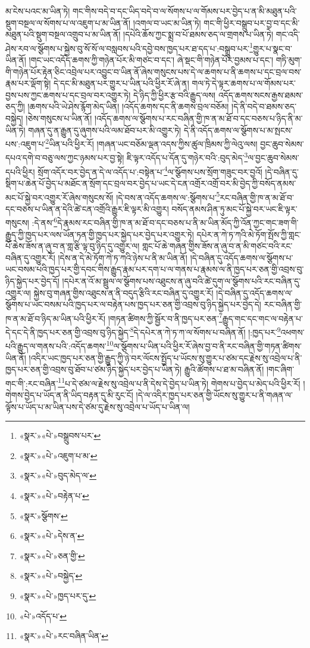 མ་ངེས་པའང་མ་ཡིན་ཏེ། གང་གིས་བདེ་བ་དང་ཡིད་བདེ་བ་ལ་སོགས་པ་ལ་གོམས་པར་བྱེད་པ་ན་མི་མཐུན་པའི་སྡུག་བསྔལ་ལ་སོགས་པ་ལ་འཇུག་པ་མ་ཡིན་ནོ། །འགལ་བ་ཡང་མ་ཡིན་ཏེ། གང་གི་ཕྱིར་བསྒྲུབ་པར་བྱ་བ་དང་མི་མཐུན་པའི་སྡུག་བསྔལ་འགྲུབ་པ་མ་ཡིན་ནོ། །དཔེའི་ཆོས་ཀྱང་སྨྲ་བ་པོ་ཐམས་ཅད་ལ་གྲགས་པ་ཡིན་ཏེ། གང་འདི་ཤེས་རབ་ལ་སྩོགས་པ་སྐྱེས་བུ་སོ་སོ་ལ་བསླབས་པའི་དབྱེ་བས་ཁྱད་པར་ཐ་དད་པ་:བསྒྲུབ་པར་\footnote{«སྣར་»«པེ་»བསྒྲུབས་པར་}གྱུར་པ་སྣང་བ་ཡིན་ནོ། །གང་ཡང་འདོད་ཆགས་ཀྱི་གཉེན་པོར་མི་གཙང་བ་དང་། ཞེ་སྡང་གི་གཉེན་པོར་བྱམས་པ་དང་། གཏི་མུག་གི་གཉེན་པོར་རྟེན་ཅིང་འབྲེལ་པར་འབྱུང་བ་ཡིན་ནོ་ཞེས་གསུངས་པས་དེ་ལ་ཆགས་པ་ནི་ཆགས་པ་དང་བྲལ་བས་རྣམ་པར་ལྡོག་སྟེ། དེ་དང་མི་མཐུན་པར་གྱུར་པ་ཡིན་པའི་ཕྱིར་རོ་ཞེ་ན། གལ་ཏེ་དེ་ལྟར་ཆགས་པ་ལ་གོམས་པར་བྱས་པས་ཀྱང་ཆགས་པ་དང་བྲལ་བར་འགྱུར་ཏེ། དེ་ཉིད་ཀྱི་ཕྱིར་རྩ་བའི་རྒྱུད་ལས། འདོད་ཆགས་སངས་རྒྱས་ཐམས་ཅད་ཀྱི། །ཆགས་པའི་ཡེ་ཤེས་རྙོག་མེད་ཡིན། །འདོད་ཆགས་དང་ནི་ཆགས་བྲལ་བཅོམ། །དེ་ནི་བདེ་བ་ཐམས་ཅད་བསྐྱེད། །ཅེས་གསུངས་པ་ཡིན་ནོ། །འདོད་ཆགས་ལ་སྩོགས་པ་རང་བཞིན་གྱི་ཁ་ན་མ་ཐོ་བ་དང་བཅས་པ་ཉིད་ནི་མ་ཡིན་ཏེ། གཞན་དུ་ན་རྒྱུན་དུ་ཞུགས་པའི་ལམ་ཐོབ་པར་མི་འགྱུར་ཏེ། དེ་ནི་འདོད་ཆགས་ལ་སྩོགས་པ་མ་སྤངས་པས་:འཇུག་པ་\footnote{«སྣར་»«པེ་»འཇུག་པ་མ་}ཡིན་པའི་ཕྱིར་རོ། །གཞན་ཡང་བཅོམ་ལྡན་འདས་ཀྱིས་ཚུལ་ཁྲིམས་ཀྱི་ལེའུ་ལས། བྱང་ཆུབ་སེམས་དཔའ་དགེ་བ་བཅུ་ལས་ཀྱང་ཉམས་པར་བྱ་སྟེ། ཇི་ལྟར་འདོད་པ་དོན་དུ་གཉེར་བའི་:བུད་མེད་\footnote{«སྣར་»«པེ་»བུད་མེད་ལ་}ལ་བྱང་ཆུབ་སེམས་དཔའི་ཕྱིར། སྲོག་འདོར་བར་བྱེད་ན་དེ་ལ་འདོད་པ་:བསྟེན་པ་\footnote{«སྣར་»«པེ་»བརྟེན་པ་}ལ་སྩོགས་པས་སྲོག་གཟུང་བར་བྱའོ། །དེ་བཞིན་དུ་སྡིག་པ་ཆེན་པོ་བྱེད་པ་མཐོང་ན་སྲོག་དང་བྲལ་བར་བྱེད་པ་ཡང་དེ་ངན་འགྲོར་འགྲོ་བར་མི་བྱེད་ཀྱི་བསོད་ནམས་མང་པོ་སྐྱེ་བར་འགྱུར་རོ་ཞེས་གསུངས་སོ། །དེ་བས་ན་འདོད་ཆགས་ལ་:སྩོགས་པ་\footnote{«སྣར་»སྩོགས་}རང་བཞིན་གྱི་ཁ་ན་མ་ཐོ་བ་དང་བཅས་པ་ཡིན་ན་དེའི་ཚེ་ངན་འགྲོའི་རྒྱུར་ཇི་ལྟར་མི་འགྱུར། བསོད་ནམས་ཤིན་ཏུ་མང་པོ་སྐྱེ་བར་ཡང་ཇི་ལྟར་གསུངས། :དེ་ནས་\footnote{«སྣར་»«པེ་»དེས་ན་}དེ་རྣམས་རང་བཞིན་གྱི་ཁ་ན་མ་ཐོ་བ་དང་བཅས་པ་ནི་མ་ཡིན་མོད་ཀྱི་འོན་ཀྱང་གང་ཟག་གི་རྒྱུད་ཀྱི་ཁྱད་པར་ལས་ཡོན་ཏན་གྱི་ཁྱད་པར་སྐྱེད་པར་བྱེད་པར་འགྱུར་ཏེ། དཔེར་ན་ཀེ་ཏ་ཀའི་མེ་ཏོག་སྤོས་ཀྱི་གླང་པོ་ཆེས་ཟོས་ན་ཞུ་བ་ན་གླ་རྩི་ལྟ་བུ་ཉིད་དུ་འགྱུར་ལ། གླང་པོ་ཆེ་གཞན་གྱིས་ཟོས་ན་ཞུ་བ་ན་མི་གཙང་བའི་རང་བཞིན་དུ་འགྱུར་རོ། །དེས་ན་དེ་མེ་ཏོག་ཀེ་ཏ་ཀའི་ཉེས་པ་ནི་མ་ཡིན་ནོ། །དེ་བཞིན་དུ་འདོད་ཆགས་ལ་སྩོགས་པ་ཡང་བསམ་པའི་ཁྱད་པར་གྱི་དབང་གིས་རྒྱུད་རྣམ་པར་དག་པ་ལ་གནས་པ་རྣམས་ལ་ནི་ཁྱད་པར་ཅན་གྱི་འབྲས་བུ་ཉིད་སྐྱེད་པར་བྱེད་དོ། །དཔེར་ན་འོ་མ་སྦྲུལ་ལ་སྩོགས་པས་འཐུངས་ན་ཞུ་བའི་ཚེ་དུག་ལ་སྩོགས་པའི་རང་བཞིན་དུ་འགྱུར་ལ། སྐྱེས་བུ་གཞན་གྱིས་འཐུངས་ན་ནི་བདུད་རྩིའི་རང་བཞིན་དུ་འགྱུར་རོ། །དེ་བཞིན་དུ་འདོད་ཆགས་ལ་སྩོགས་པ་ཡང་བསམ་པའི་ཁྱད་པར་ལ་བརྟེན་པས་ཁྱད་པར་ཅན་གྱི་འབྲས་བུ་ཉིད་སྐྱེད་པར་བྱེད་དེ། རང་བཞིན་གྱི་ཁ་ན་མ་ཐོ་བ་ཉིད་མ་ཡིན་པའི་ཕྱིར་རོ། །གཏན་ཚིགས་ཀྱི་སྦྱོར་བ་ནི་ཁྱད་པར་ཅན་\footnote{«སྣར་»«པེ་»ཅན་གྱི་}རྒྱུད་གང་དང་གང་ལ་བརྟེན་པ་དེ་དང་དེ་ནི་ཁྱད་པར་ཅན་གྱི་འབྲས་བུ་ཉིད་སྐྱེད་\footnote{«སྣར་»«པེ་»བསྐྱེད་}དེ་དཔེར་ན་ཀེ་ཏ་ཀ་ལ་སོགས་པ་བཞིན་ནོ། །:ཁྱད་པར་\footnote{«སྣར་»«པེ་»ཁྱད་པར་དུ་}འཕགས་པའི་རྒྱུད་ལ་གནས་པའི་:འདོད་ཆགས་\footnote{«པེ་»འདོད་པ་}ལ་སྩོགས་པ་ཡིན་པའི་ཕྱིར་རོ་ཞེས་བྱ་བ་ནི་རང་བཞིན་གྱི་གཏན་ཚིགས་ཡིན་ནོ། །འདིར་ཡང་ཁྱད་པར་ཅན་གྱི་རྒྱུད་ཀྱི་ཉེ་བར་ལོངས་སྤྱོད་པ་ཡོངས་སུ་གྱུར་པ་ཙམ་དང་རྗེས་སུ་འབྲེལ་པ་ནི་ཁྱད་པར་ཅན་གྱི་འབྲས་བུ་ཐོབ་པ་ཙམ་ཉིད་སྐྱེད་པར་བྱེད་པ་ཡིན་ཏེ། རྒྱུའི་ཚོགས་པ་ཐ་མ་བཞིན་ནོ། །གང་ཞིག་གང་གི་:རང་བཞིན་\footnote{«སྣར་»«པེ་»རང་བཞིན་ཡིན་}པ་དེ་ཙམ་ལ་རྗེས་སུ་འབྲེལ་པ་ནི་དེས་དེ་བྱེད་པ་ཡིན་ཏེ། གེགས་པ་བྱེད་པ་མེད་པའི་ཕྱིར་རོ། །གེགས་བྱེད་པ་ཡོད་ན་ནི་ཡིད་བརྟན་དུ་མི་རུང་ངོ། །དེ་ལ་འདིར་ཁྱད་པར་ཅན་གྱི་ཡོངས་སུ་གྱུར་པ་ནི་གཞན་ལ་ལྟོས་པ་ཡོད་པ་མ་ཡིན་པས་དེ་ཙམ་དུ་རྗེས་སུ་འབྲེལ་པ་ཡོད་པ་ཡིན་ལ། 